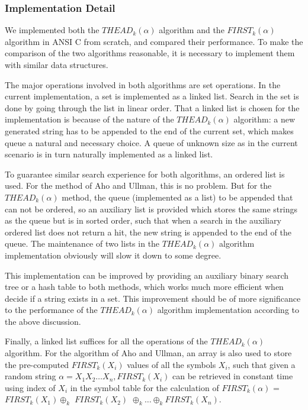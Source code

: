 \documentclass{sig-alternate-05-2015}
\begin{document}
\subsubsection{Implementation Detail}
We implemented both the $THEAD_k(\alpha)$ algorithm and the
$FIRST_k(\alpha)$ algorithm in ANSI C from scratch, and compared their performance. 
To make the comparison of the two algorithms reasonable,
it is necessary to implement them with similar data
structures.

The major operations involved in both algorithms are set
operations. In the current implementation, a set is implemented
as a linked list. Search in the set is done by going
through the list in linear order. That a linked list is chosen
for the implementation is because of the nature of the
$THEAD_k(\alpha)$ algorithm: a new generated string has to be
appended to the end of the current set, which makes queue
a natural and necessary choice. A queue of unknown size as
in the current scenario is in turn naturally implemented as a
linked list.

To guarantee similar search experience for both algorithms,
an ordered list is used. For the method of Aho and
Ullman, this is no problem. But for the $THEAD_k(\alpha)$ method,
the queue (implemented as a list) to be appended that can
not be ordered, so an auxiliary list is provided which stores
the same strings as the queue but is in sorted order, such
that when a search in the auxiliary ordered list does not
return a hit, the new string is appended to the end of the
queue. The maintenance of two lists in the $THEAD_k(\alpha)$
algorithm implementation obviously will slow it down to
some degree.

This implementation can be improved by providing an
auxiliary binary search tree or a hash table to both methods,
which works much more efficient when decide if a string
exists in a set. This improvement should be of more significance
to the performance of the $THEAD_k(\alpha)$ algorithm
implementation according to the above discussion.

Finally, a linked list suffices for all the operations of the
$THEAD_k(\alpha)$ algorithm. For the algorithm of Aho and
Ullman, an array is also used to store the pre-computed
$FIRST_k(X_i)$ values of all the symbols $X_i$, such that given a
random string $α = X_1X_2 \ldots X_n, FIRST_k(X_i)$ can be retrieved
in constant time using index of $X_i$ in the symbol table for
the calculation of $FIRST_k(\alpha)$ = $FIRST_k(X_1)\oplus_k$
$FIRST_k(X_2)$ $\oplus_k …\oplus_k FIRST_k(X_n)$.
\end{document}

